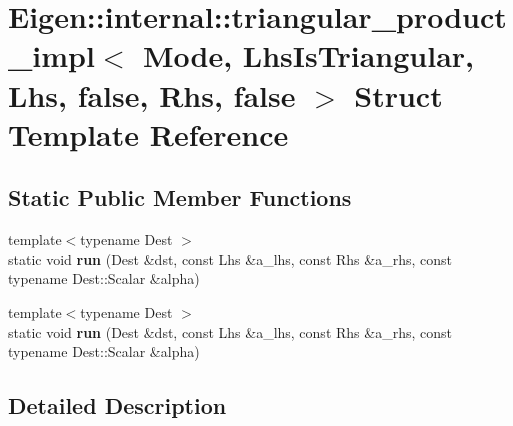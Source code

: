 \hypertarget{struct_eigen_1_1internal_1_1triangular__product__impl_3_01_mode_00_01_lhs_is_triangular_00_01_lh44afb66a9d3654cd1beb7f851ecab864}{}\section{Eigen\+:\+:internal\+:\+:triangular\+\_\+product\+\_\+impl$<$ Mode, Lhs\+Is\+Triangular, Lhs, false, Rhs, false $>$ Struct Template Reference}
\label{struct_eigen_1_1internal_1_1triangular__product__impl_3_01_mode_00_01_lhs_is_triangular_00_01_lh44afb66a9d3654cd1beb7f851ecab864}
\subsection*{Static Public Member Functions}
\begin{DoxyCompactItemize}
\item 
\mbox{\label{struct_eigen_1_1internal_1_1triangular__product__impl_3_01_mode_00_01_lhs_is_triangular_00_01_lh44afb66a9d3654cd1beb7f851ecab864_a94a33a21f729a7ce916ea08ddd0c56f4}} 
{\footnotesize template$<$typename Dest $>$ }\\static void {\bfseries run} (Dest \&dst, const Lhs \&a\+\_\+lhs, const Rhs \&a\+\_\+rhs, const typename Dest\+::\+Scalar \&alpha)
\item 
\mbox{\label{struct_eigen_1_1internal_1_1triangular__product__impl_3_01_mode_00_01_lhs_is_triangular_00_01_lh44afb66a9d3654cd1beb7f851ecab864_a94a33a21f729a7ce916ea08ddd0c56f4}} 
{\footnotesize template$<$typename Dest $>$ }\\static void {\bfseries run} (Dest \&dst, const Lhs \&a\+\_\+lhs, const Rhs \&a\+\_\+rhs, const typename Dest\+::\+Scalar \&alpha)
\end{DoxyCompactItemize}


\subsection{Detailed Description}
